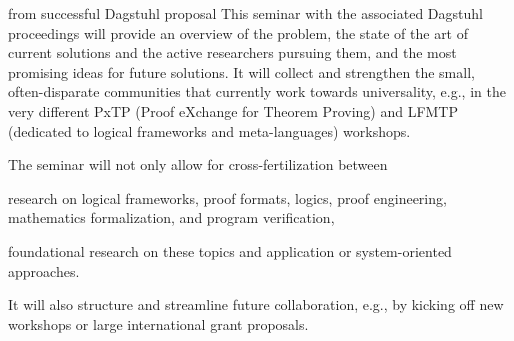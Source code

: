 \begin{oldpart}{from successful Dagstuhl proposal}
This seminar with the associated Dagstuhl proceedings will provide an overview of the problem, the state of the art of current solutions and the active researchers pursuing them, and the most promising ideas for future solutions.
It will collect and strengthen the small, often-disparate communities that currently work towards universality, e.g., in the very different PxTP (Proof eXchange for Theorem Proving) and LFMTP (dedicated to logical frameworks and meta-languages) workshops.

The seminar will not only allow for cross-fertilization between
 \begin{compactitem}
  \item research on logical frameworks, proof formats, logics, proof engineering, mathematics formalization, and program verification,
  \item foundational research on these topics and application or system-oriented approaches.
 \end{compactitem}
It will also structure and streamline future collaboration, e.g., by kicking off new workshops or large international grant proposals.
\end{oldpart}